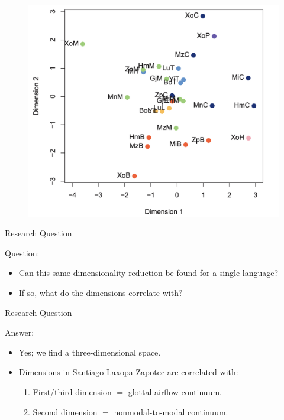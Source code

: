 \documentclass{beamer}
\begin{document}
\begin{frame}{\citet{keatingCrosslanguageAcousticSpace2023}}
  \begin{figure}[h!]
    \centering
    \includegraphics[width = 0.8\linewidth]{images/Keating_dimension.png}
  \end{figure}
\end{frame}

\begin{frame}{Research Question}
  \begin{block}{Question:}
    \begin{itemize}
      \item Can this same dimensionality reduction be found for a single language?
      \item If so, what do the dimensions correlate with?
    \end{itemize}
  \end{block}
\end{frame}

\begin{frame}{Research Question}
  \begin{block}{Answer:}
    \begin{itemize}
      \item Yes; we find a three-dimensional space.
      \item Dimensions in Santiago Laxopa Zapotec are correlated with:
      \begin{enumerate}
        \item First/third dimension $=$ glottal-airflow continuum. 
        \item Second dimension $=$ nonmodal-to-modal continuum.
      \end{enumerate}
    \end{itemize}  
  \end{block}
\end{frame}
\end{document}
